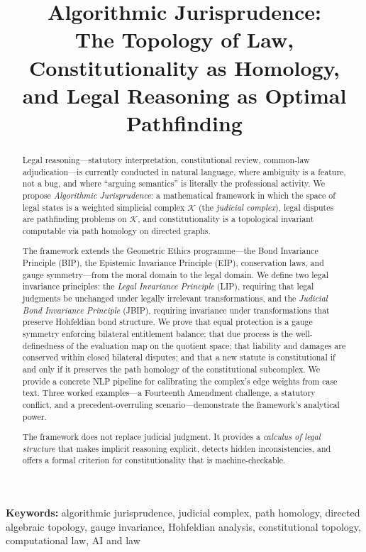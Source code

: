 \documentclass[12pt]{article}
\title{\textbf{Algorithmic Jurisprudence:\\The Topology of Law, Constitutionality as Homology,\\and Legal Reasoning as Optimal Pathfinding}}
\author{}
\date{}
\theoremstyle{definition}
\theoremstyle{remark}
\begin{document}
\maketitle

\noindent\textbf{Keywords:} algorithmic jurisprudence, judicial complex, path homology, directed algebraic topology, gauge invariance, Hohfeldian analysis, constitutional topology, computational law, AI and law

\begin{abstract}
Legal reasoning---statutory interpretation, constitutional review, common-law adjudication---is currently conducted in natural language, where ambiguity is a feature, not a bug, and where ``arguing semantics'' is literally the professional activity.  We propose \emph{Algorithmic Jurisprudence}: a mathematical framework in which the space of legal states is a weighted simplicial complex $\mathcal{K}$ (the \emph{judicial complex}), legal disputes are pathfinding problems on $\mathcal{K}$, and constitutionality is a topological invariant computable via path homology on directed graphs.

The framework extends the Geometric Ethics programme---the Bond Invariance Principle (BIP), the Epistemic Invariance Principle (EIP), conservation laws, and gauge symmetry---from the moral domain to the legal domain.  We define two legal invariance principles: the \emph{Legal Invariance Principle} (LIP), requiring that legal judgments be unchanged under legally irrelevant transformations, and the \emph{Judicial Bond Invariance Principle} (JBIP), requiring invariance under transformations that preserve Hohfeldian bond structure.  We prove that equal protection is a gauge symmetry enforcing bilateral entitlement balance; that due process is the well-definedness of the evaluation map on the quotient space; that liability and damages are conserved within closed bilateral disputes; and that a new statute is constitutional if and only if it preserves the path homology of the constitutional subcomplex.  We provide a concrete NLP pipeline for calibrating the complex's edge weights from case text.  Three worked examples---a Fourteenth Amendment challenge, a statutory conflict, and a precedent-overruling scenario---demonstrate the framework's analytical power.

The framework does not replace judicial judgment.  It provides a \emph{calculus of legal structure} that makes implicit reasoning explicit, detects hidden inconsistencies, and offers a formal criterion for constitutionality that is machine-checkable.
\end{abstract}
\end{document}
